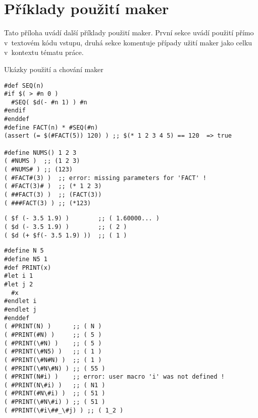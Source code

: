 \documentclass[thesis=M,czech]{FITthesis}[2012/06/26]
\begin{document}
\chapter{Příklady použití maker}\label{appendix:macros}
Tato příloha uvádí další příklady použití maker.
První sekce uvádí použití přímo v~textovém kódu vstupu,
druhá sekce komentuje případy užití maker jako celku
v~kontextu tématu práce.


\begin{section}{Ukázky použití a chování maker}\label{s:macros:examples}
\begin{Verbatim}[samepage=true]
#def SEQ(n)
#if $( > #n 0 )
  #SEQ( $d(- #n 1) ) #n
#endif
#enddef
#define FACT(n) * #SEQ(#n)
(assert (= $(#FACT(5)) 120) ) ;; $(* 1 2 3 4 5) == 120  => true

#define NUMS() 1 2 3
( #NUMS )  ;; (1 2 3)
( #NUMS# ) ;; (123)
( #FACT#(3) )  ;; error: missing parameters for 'FACT' !
( #FACT(3)# )  ;; (* 1 2 3)
( ##FACT(3) )  ;; (FACT(3))
( ###FACT(3) ) ;; (*123)
\end{Verbatim}
\begin{Verbatim}[samepage=true]
( $f (- 3.5 1.9) )        ;; ( 1.60000... )
( $d (- 3.5 1.9) )        ;; ( 2 )
( $d (+ $f(- 3.5 1.9) ))  ;; ( 1 )
\end{Verbatim}
\begin{Verbatim}[samepage=true]
#define N 5
#define N5 1
#def PRINT(x)
#let i 1
#let j 2
  #x
#endlet i
#endlet j
#enddef
( #PRINT(N) )      ;; ( N )
( #PRINT(#N) )     ;; ( 5 )
( #PRINT(\#N) )    ;; ( 5 )
( #PRINT(\#N5) )   ;; ( 1 )
( #PRINT(\#N#N) )  ;; ( 1 )
( #PRINT(\#N\#N) ) ;; ( 55 )
( #PRINT(N#i) )    ;; error: user macro 'i' was not defined !
( #PRINT(N\#i) )   ;; ( N1 )
( #PRINT(#N\#i) )  ;; ( 51 )
( #PRINT(\#N\#i) ) ;; ( 51 )
( #PRINT(\#i\##_\#j) ) ;; ( 1_2 )
\end{Verbatim}
\end{section} %

\end{document}
